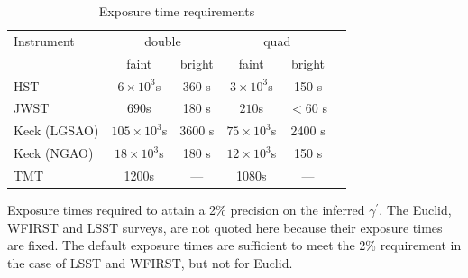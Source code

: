 \documentclass[a4paper,11pt]{article}
\begin{document}
{%
\begin{table}\footnotesize
\begin{center}
\caption{Exposure time requirements}
\begin{tabular}{lccccc|}
\hline \hline
Instrument & \multicolumn{2}{c}{double} & \multicolumn{2}{c}{quad} \\
  & faint  & bright &  faint  &  bright \\
\hline
  HST   & $6\times10^3$s & 360 s  & $3\times10^3$s & 150 s \\
  JWST   & $690$s & 180 s  & $210$s & $<$60 s \\
  Keck (LGSAO)   & $105\times10^3$s & 3600 s  & $75\times10^3$s & 2400 s \\
  Keck (NGAO)   & $18\times10^3$s & 180 s  & $12\times10^3$s & 150 s \\
  TMT   &  1200s  &  ---   &   1080s   &  ---  \\
\hline
\hline
\end{tabular}
\begin{tablenotes}
\item
Exposure times required to attain a 2\% precision on the inferred $\gamma^\prime.$
 The Euclid, WFIRST and LSST surveys, are not quoted here because their exposure times are fixed. The default exposure times are sufficient to meet the 2\% requirement in the case of LSST and WFIRST, but not for Euclid.\\
\end{tablenotes}
\label{tab:exptimes}
\end{center}
\end{table}

}
\end{document}
